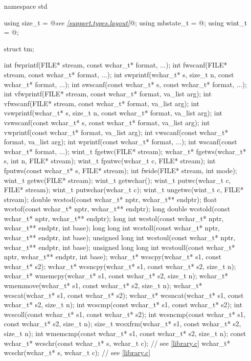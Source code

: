 \begin{codeblock}
namespace std {
  using size_t = @\textit{see \ref{support.types.layout}}@;
  using mbstate_t = @\seebelow@;
  using wint_t = @\seebelow@;

  struct tm;

  int fwprintf(FILE* stream, const wchar_t* format, ...);
  int fwscanf(FILE* stream, const wchar_t* format, ...);
  int swprintf(wchar_t* s, size_t n, const wchar_t* format, ...);
  int swscanf(const wchar_t* s, const wchar_t* format, ...);
  int vfwprintf(FILE* stream, const wchar_t* format, va_list arg);
  int vfwscanf(FILE* stream, const wchar_t* format, va_list arg);
  int vswprintf(wchar_t* s, size_t n, const wchar_t* format, va_list arg);
  int vswscanf(const wchar_t* s, const wchar_t* format, va_list arg);
  int vwprintf(const wchar_t* format, va_list arg);
  int vwscanf(const wchar_t* format, va_list arg);
  int wprintf(const wchar_t* format, ...);
  int wscanf(const wchar_t* format, ...);
  wint_t fgetwc(FILE* stream);
  wchar_t* fgetws(wchar_t* s, int n, FILE* stream);
  wint_t fputwc(wchar_t c, FILE* stream);
  int fputws(const wchar_t* s, FILE* stream);
  int fwide(FILE* stream, int mode);
  wint_t getwc(FILE* stream);
  wint_t getwchar();
  wint_t putwc(wchar_t c, FILE* stream);
  wint_t putwchar(wchar_t c);
  wint_t ungetwc(wint_t c, FILE* stream);
  double wcstod(const wchar_t* nptr, wchar_t** endptr);
  float wcstof(const wchar_t* nptr, wchar_t** endptr);
  long double wcstold(const wchar_t* nptr, wchar_t** endptr);
  long int wcstol(const wchar_t* nptr, wchar_t** endptr, int base);
  long long int wcstoll(const wchar_t* nptr, wchar_t** endptr, int base);
  unsigned long int wcstoul(const wchar_t* nptr, wchar_t** endptr, int base);
  unsigned long long int wcstoull(const wchar_t* nptr, wchar_t** endptr, int base);
  wchar_t* wcscpy(wchar_t* s1, const wchar_t* s2);
  wchar_t* wcsncpy(wchar_t* s1, const wchar_t* s2, size_t n);
  wchar_t* wmemcpy(wchar_t* s1, const wchar_t* s2, size_t n);
  wchar_t* wmemmove(wchar_t* s1, const wchar_t* s2, size_t n);
  wchar_t* wcscat(wchar_t* s1, const wchar_t* s2);
  wchar_t* wcsncat(wchar_t* s1, const wchar_t* s2, size_t n);
  int wcscmp(const wchar_t* s1, const wchar_t* s2);
  int wcscoll(const wchar_t* s1, const wchar_t* s2);
  int wcsncmp(const wchar_t* s1, const wchar_t* s2, size_t n);
  size_t wcsxfrm(wchar_t* s1, const wchar_t* s2, size_t n);
  int wmemcmp(const wchar_t* s1, const wchar_t* s2, size_t n);
  const wchar_t* wcschr(const wchar_t* s, wchar_t c);           // see \ref{library.c}
  wchar_t* wcschr(wchar_t* s, wchar_t c);                       // see \ref{library.c}
}
\end{codeblock}
